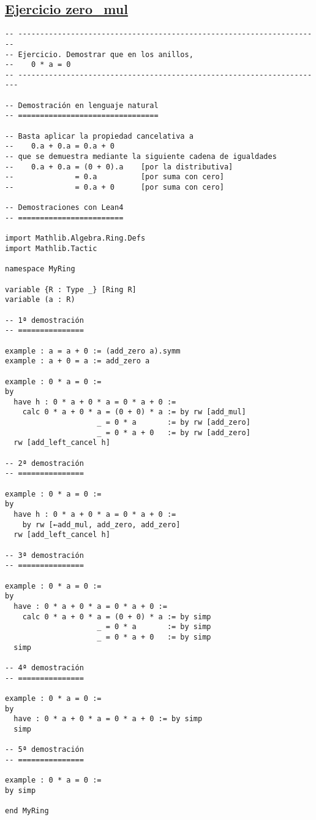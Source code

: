 \subsection{\href{./src/Basicos/zero\_mul.lean}{Ejercicio zero\_mul}}
\label{sec:orgc5c090b}
\begin{verbatim}
-- ---------------------------------------------------------------------
-- Ejercicio. Demostrar que en los anillos,
--    0 * a = 0
-- ----------------------------------------------------------------------

-- Demostración en lenguaje natural
-- ================================

-- Basta aplicar la propiedad cancelativa a
--    0.a + 0.a = 0.a + 0
-- que se demuestra mediante la siguiente cadena de igualdades
--    0.a + 0.a = (0 + 0).a    [por la distributiva]
--              = 0.a          [por suma con cero]
--              = 0.a + 0      [por suma con cero]

-- Demostraciones con Lean4
-- ========================

import Mathlib.Algebra.Ring.Defs
import Mathlib.Tactic

namespace MyRing

variable {R : Type _} [Ring R]
variable (a : R)

-- 1ª demostración
-- ===============

example : a = a + 0 := (add_zero a).symm
example : a + 0 = a := add_zero a

example : 0 * a = 0 :=
by
  have h : 0 * a + 0 * a = 0 * a + 0 :=
    calc 0 * a + 0 * a = (0 + 0) * a := by rw [add_mul]
                     _ = 0 * a       := by rw [add_zero]
                     _ = 0 * a + 0   := by rw [add_zero]
  rw [add_left_cancel h]

-- 2ª demostración
-- ===============

example : 0 * a = 0 :=
by
  have h : 0 * a + 0 * a = 0 * a + 0 :=
    by rw [←add_mul, add_zero, add_zero]
  rw [add_left_cancel h]

-- 3ª demostración
-- ===============

example : 0 * a = 0 :=
by
  have : 0 * a + 0 * a = 0 * a + 0 :=
    calc 0 * a + 0 * a = (0 + 0) * a := by simp
                     _ = 0 * a       := by simp
                     _ = 0 * a + 0   := by simp
  simp

-- 4ª demostración
-- ===============

example : 0 * a = 0 :=
by
  have : 0 * a + 0 * a = 0 * a + 0 := by simp
  simp

-- 5ª demostración
-- ===============

example : 0 * a = 0 :=
by simp

end MyRing
\end{verbatim}

